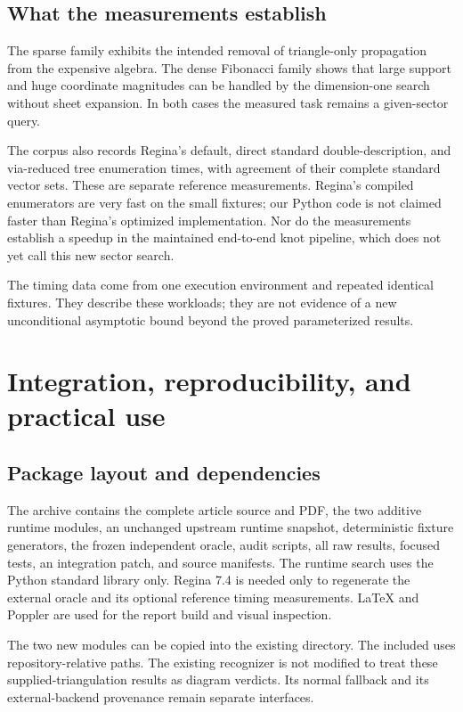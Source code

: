 \documentclass[11pt]{article}
\theoremstyle{definition}
\theoremstyle{remark}
\begin{document}


\subsection{What the measurements establish}

The sparse family exhibits the intended removal of triangle-only propagation
from the expensive algebra. The dense Fibonacci family shows that large
support and huge coordinate magnitudes can be handled by the dimension-one
search without sheet expansion. In both cases the measured task remains a
given-sector query.

The corpus also records Regina's default, direct standard double-description,
and via-reduced tree enumeration times, with agreement of their complete
standard vector sets. These are separate reference measurements. Regina's
compiled enumerators are very fast on the small fixtures; our Python code is
not claimed faster than Regina's optimized implementation. Nor do the
measurements establish a speedup in the maintained end-to-end knot pipeline,
which does not yet call this new sector search.

The timing data come from one execution environment and repeated identical
fixtures. They describe these workloads; they are not evidence of a new
unconditional asymptotic bound beyond the proved parameterized results.

\section{Integration, reproducibility, and practical use}
\label{sec:integration}

\subsection{Package layout and dependencies}

The archive contains the complete article source and PDF, the two additive
runtime modules, an unchanged upstream runtime snapshot, deterministic fixture
generators, the frozen independent oracle, audit scripts, all raw results,
focused tests, an integration patch, and source manifests. The runtime search
uses the Python standard library only. Regina 7.4 is needed only to regenerate
the external oracle and its optional reference timing measurements. LaTeX and
Poppler are used for the report build and visual inspection.

The two new modules can be copied into the existing
 directory. The included
 uses repository-relative paths. The existing recognizer
is not modified to treat these supplied-triangulation results as diagram
verdicts. Its normal fallback and its external-backend provenance remain
separate interfaces.
\end{document}
